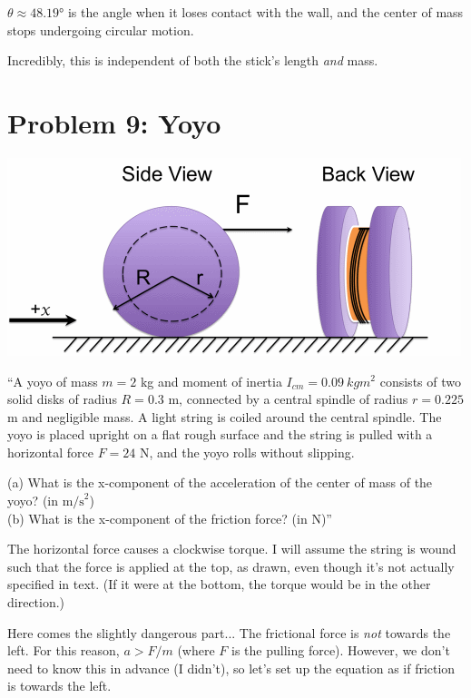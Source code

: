 \documentclass[8.01x]{subfiles}
\begin{document}
$\theta \approx \ang{48.19}$ is the angle when it loses contact with the wall, and the center of mass stops undergoing circular motion.

Incredibly, this is independent of both the stick's length \emph{and} mass.

\section{Problem 9: Yoyo}

\begin{center}
\includegraphics[scale=1.2]{Graphics/midterm3p9}
\end{center}

``A yoyo of mass $m = 2$ kg and moment of inertia $I_{cm} = \SI{0.09}{kg m^2}$ consists of two solid disks of radius $R = 0.3$ m, connected by a central spindle of radius $r = 0.225$ m and negligible mass. A light string is coiled around the central spindle. The yoyo is placed upright on a flat rough surface and the string is pulled with a horizontal force $F = 24$ N, and the yoyo rolls without slipping.

(a) What is the x-component of the acceleration of the center of mass of the yoyo? (in $\text{m/s}^2$)\\
(b) What is the x-component of the friction force? (in N)''

The horizontal force causes a clockwise torque. I will assume the string is wound such that the force is applied at the top, as drawn, even though it's not actually specified in text. (If it were at the bottom, the torque would be in the other direction.)

Here comes the slightly dangerous part... The frictional force is \emph{not} towards the left. For this reason, $a > F/m$ (where $F$ is the pulling force). However, we don't need to know this in advance (I didn't), so let's set up the equation as if friction is towards the left.
\end{document}
